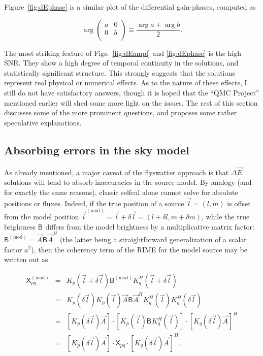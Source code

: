 \documentclass{aa}
\newcommand{\matrixtt}[4]{\left( \begin{array}{cc}#1&#2\\#3&#4\\\end{array} \right)}
\newcommand{\herm}{H}
\newcommand{\jones}[2]{\vec {#1}_{#2}}
\newcommand{\jonesT}[2]{\vec {#1}^{\herm}_{#2}}
\newcommand{\coh}[2]{\mathsf{{#1}}_{{#2}}}
\begin{document}
Figure~\ref{fig:dEphase} is a similar plot of the differential gain-phases, computed as

\[
\arg\matrixtt{a}{0}{0}{b} \equiv \frac{\arg a + \arg b}{2}.
\]

The most striking feature of Figs.~\ref{fig:dEampl} and \ref{fig:dEphase} is the high SNR. They show a high degree of temporal continuity in the solutions, and statistically significant structure. This strongly suggests that the solutions represent real physical or numerical effects. As to the nature of these effects, I still do not have satisfactory answers, though it is hoped that the ``QMC Project'' mentioned earlier will shed some more light on the issues. The rest of this section discusses some of the more prominent questions, and proposes some rather speculative explanations.
 
\subsection{Absorbing errors in the sky model\label{sec:de-analysis-model}}

As already mentioned, a major caveat of the flyswatter approach is that $\Delta\jones{E}{}$ solutions will tend to absorb inaccuracies in the source model. By analogy (and for exactly the same reasons), classic selfcal 
alone cannot solve for absolute positions or fluxes. Indeed, if the true position of a source $\vec l = (l,m)$ is offset from the model position $\vec l^\mathrm{(mod)} = \vec l + \delta\vec l = (l+\delta l,m + \delta m)$, while the true brightness $\coh{B}{}$ differs from the model brightness by a multiplicative matrix factor: $\coh{B}{}^\mathrm{(mod)} = \jones{A}{} \coh{B}{} \jonesT{A}{}$ (the latter being a straightforward generalization of a scalar factor $a^2$), then the coherency term of the RIME for the model source may be written out as

\begin{eqnarray*}
\coh{X}{pq}^\mathrm{(mod)} & = & K_{p}(\vec l + \delta\vec l) \coh{B}{}^\mathrm{(mod)} K^\herm_{q}(\vec l + \delta\vec l) \\
 & = & K_{p}(\delta\vec l) K_{p}(\vec l) \jones{A}{}\coh{B}{}\jonesT{A}{} K^\herm_{q}(\vec l) K^\herm_{q}(\delta\vec l) \\
 & = & [ K_{p}(\delta\vec l)\jones{A}{}]\cdot[K_{p}(\vec l)\coh{B}{}K^\herm_{q}(\vec l)]\cdot[K_{q}(\delta \vec l)\jones{A}{}]^\herm \\
 & = & [K_{p}(\delta\vec l)\jones{A}{}] 
       \cdot \coh{X}{pq} \cdot 
       [K_{q}(\delta\vec l)\jones{A}{}]^\herm.
\end{eqnarray*}
\end{document}
